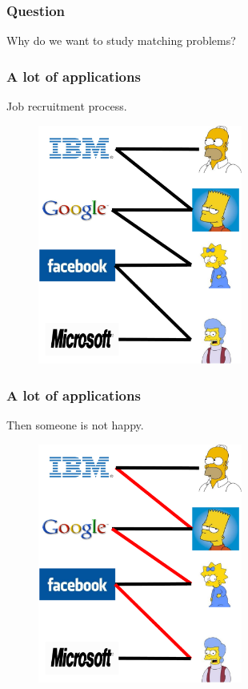 \documentclass[hyperref={pdfpagelabels=false}]{beamer}
\begin{document}
\frame
{
	\frametitle{Question}
	
	\huge{Why do we want to study matching problems?}
	
}

\frame
{
	\frametitle{A lot of applications}
	Job recruitment process.
	
	\begin{figure}[htb]
	\centering
	\includegraphics[width=0.6\textwidth]{figures/mc.pdf}
	\end{figure}
}

\frame
{
	\frametitle{A lot of applications}
	Then someone is not happy.
	
	\begin{figure}[htb]
	\centering
	\includegraphics[width=0.6\textwidth]{figures/mc1.pdf}
	\end{figure}
}
\end{document}

